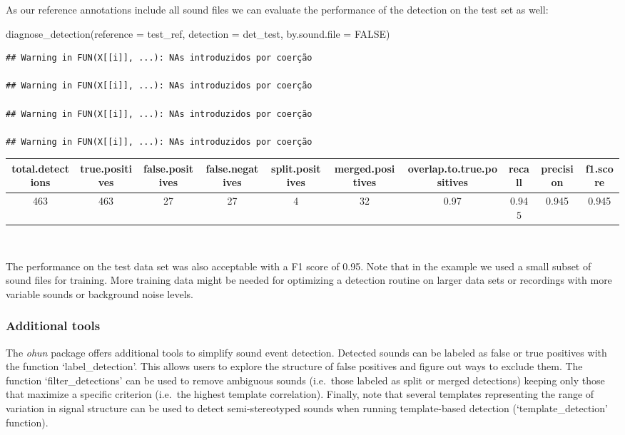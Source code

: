\documentclass[
]{article}
\newenvironment{Shaded}{\begin{snugshade}}{\end{snugshade}}
\newcommand{\AttributeTok}[1]{\textcolor[rgb]{0.77,0.63,0.00}{#1}}
\newcommand{\ConstantTok}[1]{\textcolor[rgb]{0.00,0.00,0.00}{#1}}
\newcommand{\FunctionTok}[1]{\textcolor[rgb]{0.00,0.00,0.00}{#1}}
\newcommand{\NormalTok}[1]{#1}
\begin{document}
As our reference annotations include all sound files we can evaluate the
performance of the detection on the test set as well:

\begin{Shaded}
\begin{Highlighting}[]
\FunctionTok{diagnose\_detection}\NormalTok{(}\AttributeTok{reference =}\NormalTok{ test\_ref, }\AttributeTok{detection =}\NormalTok{ det\_test, }\AttributeTok{by.sound.file =} \ConstantTok{FALSE}\NormalTok{)}
\end{Highlighting}
\end{Shaded}

\begin{verbatim}
## Warning in FUN(X[[i]], ...): NAs introduzidos por coerção

## Warning in FUN(X[[i]], ...): NAs introduzidos por coerção

## Warning in FUN(X[[i]], ...): NAs introduzidos por coerção

## Warning in FUN(X[[i]], ...): NAs introduzidos por coerção
\end{verbatim}

\begin{table}
\centering
\begin{tabular}[t]{c|c|c|c|c|c|c|c|c|c}
\hline
total.detections & true.positives & false.positives & false.negatives & split.positives & merged.positives & overlap.to.true.positives & recall & precision & f1.score\\
\hline
463 & 463 & 27 & 27 & 4 & 32 & 0.97 & 0.945 & 0.945 & 0.945\\
\hline
\end{tabular}
\end{table}

~

The performance on the test data set was also acceptable with a F1 score
of 0.95. Note that in the example we used a small subset of sound files
for training. More training data might be needed for optimizing a
detection routine on larger data sets or recordings with more variable
sounds or background noise levels.

\hypertarget{additional-tools}{%
\subsubsection{Additional tools}\label{additional-tools}}

The \emph{ohun} package offers additional tools to simplify sound event
detection. Detected sounds can be labeled as false or true positives
with the function `label\_detection'. This allows users to explore the
structure of false positives and figure out ways to exclude them. The
function `filter\_detections' can be used to remove ambiguous sounds
(i.e.~those labeled as split or merged detections) keeping only those
that maximize a specific criterion (i.e.~the highest template
correlation). Finally, note that several templates representing the
range of variation in signal structure can be used to detect
semi-stereotyped sounds when running template-based detection
(`template\_detection' function).
\end{document}
